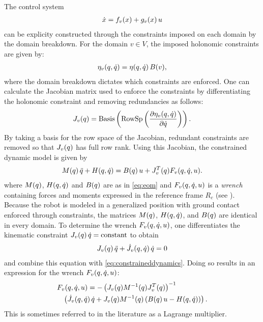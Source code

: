 The control system
\begin{align*}
  {\dot {x}} = f_v(x) + g_v(x) \, u
\end{align*}
can be explicity constructed through the constraints imposed on each domain by
the domain breakdown.
%
For the domain $v \in V$, the imposed holonomic constraints are given by:
%
\begin{align}
  \eta_{v}(q, \dot{q}) = \eta(q, \dot{q}) \, B(v),
\end{align}
%
where the domain breakdown dictates which constraints are enforced.
%
One can calculate the Jacobian matrix used to enforce the constraints by differentiating the holonomic constraint and removing redundancies as follows:
%
\begin{align}
  J_{v}(q) = \mathrm{Basis}\left( \mathrm{RowSp}\left( \frac{\partial{\eta_{v}(q, \dot{q})}}{\partial{{\dot{q}}}} \right) \right).
\end{align}
%
By taking a basis for the row space of the Jacobian, redundant constraints are removed so that $J_v(q)$ has full row rank.
%
Using this Jacobian, the constrained dynamic model is given by
%
\begin{align}
  \label{eq:constraineddynamics}
  M(q) \, \ddot{q} + H(q, \dot{q}) = B(q) \, u + J_v^T(q) F_v(q, \dot{q}, u).
\end{align}
%
where $M(q)$, $H(q, \dot{q})$ and $B(q)$ are as in \eqref{eq:eom} and $F_v(q, \dot{q}, u)$ is a {\em wrench} containing forces and moments expressed in the reference frame $R_c$ (see \cite{Murray1994}).
%
Because the robot is modeled in a generalized position with ground contact enforced through constraints, the matrices $M(q)$, $H(q, \dot{q})$, and $B(q)$ are identical in every domain.
%
To determine the wrench $F_v(q, \dot{q}, u)$, one differentiates the kinematic constraint $J_v(q) \, \dot{q} = \mathrm{constant}$ to obtain
%
\begin{align}
  J_{v}(q) \, \ddot{q} + {\dot J}_{v}(q, \dot{q}) \, \dot{q} = 0
\end{align}
%
and combine this equation with \eqref{eq:constraineddynamics}.
%
Doing so results in an expression for the wrench $F_v(q, \dot{q}, u)$:
%
\begin{align}
  \label{eq:wrench}
  \lefteqn{F_{v}\argsqdqu = -\left( J_{v}\argsq \M^{-1}\argsq J_{v}^{T}\argsq \right)^{-1} }\\
  \nonumber
  &&\left( {\dot J}_{v}\argsqdq \, \dq + J_{v}\argsq \M^{-1}\argsq \left( \B\argsq \, \uu - \HCor\argsqdq \right) \right).
\end{align}
%
This is sometimes referred to in the literature as a Lagrange multiplier.
